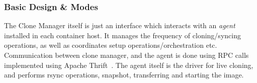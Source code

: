 
\subsubsection{Basic Design \& Modes}


The Clone Manager itself is just an interface which interacts with an \textit{agent} installed in each container host.
It manages the frequency of cloning/syncing operations, as well as  coordinates setup operations/orchestration etc.
Communication between clone manager, and the agent is done using RPC calls implemented using Apache Thrift~\cite{thrift}.
The agent itself is the driver for live cloning, and performs rsync operations, snapshot, transferring and starting the image.
\fi
